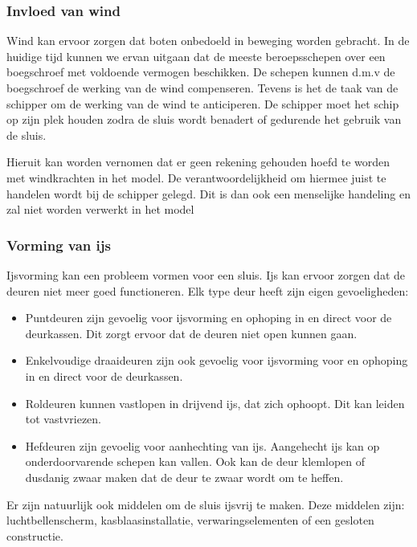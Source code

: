 \documentclass{article}
\begin{document}

\subsubsection{Invloed van wind} %
Wind kan ervoor zorgen dat boten onbedoeld in beweging worden gebracht. In de huidige tijd kunnen we ervan uitgaan dat de meeste beroepsschepen over een boegschroef  met voldoende vermogen beschikken. De schepen kunnen d.m.v de boegschroef de werking van de wind compenseren. Tevens is het de taak van de schipper om de werking van de wind te anticiperen. De schipper moet het schip op zijn plek houden zodra de sluis wordt benadert of gedurende het gebruik van de sluis.

Hieruit kan worden vernomen dat er geen rekening gehouden hoefd te worden met windkrachten in het model. De verantwoordelijkheid om hiermee juist te handelen wordt bij de schipper gelegd. Dit is dan ook een menselijke handeling en zal niet worden verwerkt in het model\cite{rijkswaterstaat2017}

\vskip0.5cm

\subsubsection{Vorming van ijs}
Ijsvorming kan een probleem vormen voor een sluis. Ijs kan ervoor zorgen dat de deuren niet meer goed functioneren. Elk type deur heeft zijn eigen gevoeligheden:
\begin{itemize}
\item Puntdeuren zijn gevoelig voor ijsvorming en ophoping in en direct voor de deurkassen. Dit zorgt ervoor dat de deuren niet open kunnen gaan.
\item Enkelvoudige draaideuren zijn ook gevoelig voor ijsvorming voor en ophoping in en direct voor de deurkassen.
\item Roldeuren kunnen vastlopen in drijvend ijs, dat zich ophoopt. Dit kan leiden tot vastvriezen.
\item Hefdeuren zijn gevoelig voor aanhechting van ijs. Aangehecht ijs kan op onderdoorvarende schepen kan vallen. Ook kan de deur klemlopen of dusdanig zwaar maken dat de deur te zwaar wordt om te heffen.
\end{itemize}

Er zijn natuurlijk ook middelen om de sluis ijsvrij te maken. Deze middelen zijn: luchtbellenscherm, kasblaasinstallatie, verwaringselementen of een gesloten constructie.
\end{document}

